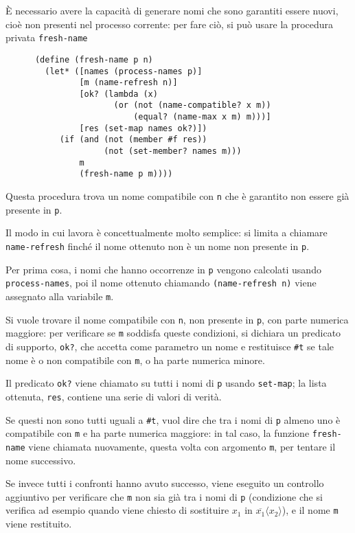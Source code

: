 \`E necessario avere la capacit\`a di generare nomi che sono garantiti
essere nuovi, cio\`e non presenti nel processo corrente: per fare ci\`o, si
pu\`o usare la procedura privata \lstinline{fresh-name}

\begin{lstlisting}
      (define (fresh-name p n)
        (let* ([names (process-names p)]
               [m (name-refresh n)]
               [ok? (lambda (x)
                      (or (not (name-compatible? x m))
                          (equal? (name-max x m) m)))]
               [res (set-map names ok?)])
           (if (and (not (member #f res))
                    (not (set-member? names m)))
               m
               (fresh-name p m))))
\end{lstlisting}

Questa procedura trova un nome compatibile con \lstinline{n} che \`e
garantito non essere gi\`a presente in \lstinline{p}.

Il modo in cui lavora \`e concettualmente molto semplice: si limita a
chiamare \lstinline{name-refresh} finch\'e il nome ottenuto non \`e
un nome non presente in \lstinline{p}.

Per prima cosa, i nomi che hanno occorrenze in \lstinline{p} vengono
calcolati usando \lstinline{process-names}, poi il nome ottenuto chiamando
\lstinline{(name-refresh n)} viene assegnato alla variabile \lstinline{m}.

Si vuole trovare il nome compatibile con \lstinline{n}, non presente in
\lstinline{p}, con parte numerica maggiore: per verificare se
\lstinline{m} soddisfa queste condizioni, si dichiara un predicato di
supporto, \lstinline{ok?}, che accetta come parametro un nome e restituisce
\lstinline{#t} se tale nome \`e o non compatibile con \lstinline{m}, o ha
parte numerica minore.

Il predicato \lstinline{ok?} viene chiamato su tutti i nomi di \lstinline{p}
usando \lstinline{set-map}; la lista ottenuta, \lstinline{res}, contiene
una serie di valori di verit\`a.

Se questi non sono tutti uguali a \lstinline{#t}, vuol dire che tra i nomi
di \lstinline{p} almeno uno \`e compatibile con \lstinline{m} e ha parte
numerica maggiore: in tal caso, la funzione \lstinline{fresh-name} viene
chiamata nuovamente, questa volta con argomento \lstinline{m}, per tentare
il nome successivo.

Se invece tutti i confronti hanno avuto successo, viene eseguito un
controllo aggiuntivo per verificare che \lstinline{m} non sia gi\`a tra
i nomi di \lstinline{p} (condizione che si verifica ad esempio quando viene
chiesto di sostituire $x_1$ in $\overline{x_1}\langle x_2\rangle$), e il
nome \lstinline{m} viene restituito.

